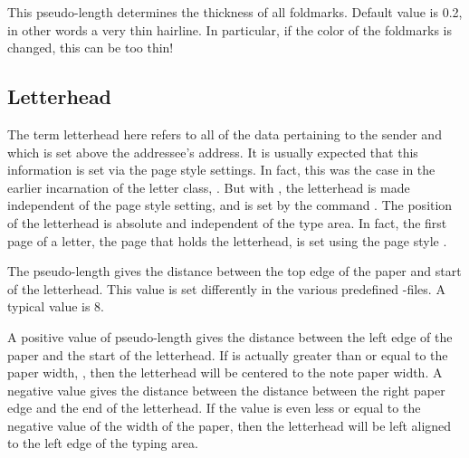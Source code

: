 \begin{Declaration}
\end{Declaration}
This pseudo-length determines the
thickness of all foldmarks. Default value is 0.2, in other words a
very thin hairline. In particular, if the color of the foldmarks is
changed, this can be too thin!%
\EndIndexGroup
%
\EndIndexGroup


\subsection{Letterhead}
\BeginIndexGroup
{}

The term letterhead here refers to all of the data pertaining to the sender
and which is set above the addressee's address. It is usually expected that
this information is set via the page style settings. In fact, this was the
case in the earlier incarnation of the letter class,
. But with , the
letterhead is made independent of the page style setting, and is set by the
command .
\iftrue%
The position of the letterhead is absolute and independent of the type
area. In fact, the first page of a letter, the page that holds the letterhead,
is set using the page style .%
\fi

\begin{Declaration}
\end{Declaration}
The pseudo-length  gives the distance between the top
edge of the paper and start of the letterhead. This value is set differently
in the various predefined
-files. A
typical value is 8.%
%
\EndIndexGroup


\begin{Declaration}
\end{Declaration}
A positive value of pseudo-length
 gives the distance
between the left edge of the paper and the start of the
letterhead. If is actually greater than or equal to the
paper width,
,
then the letterhead will be centered to the note paper width. A negative value
gives the distance between the distance between the right paper edge and the
end of the letterhead. If the value is even less or equal to the negative
value of the width of the paper, then the letterhead will be left aligned to
the left edge of the typing area.

